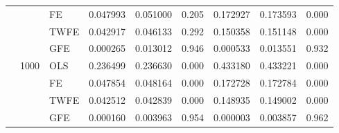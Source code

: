 \begin{tabular}{lll|ccc|ccc}
   &      & FE  &  0.047993 &  0.051000 &                 0.205 &  0.172927 &  0.173593 &                 0.000 \\
   &      & TWFE  &  0.042917 &  0.046133 &                 0.292 &  0.150358 &  0.151148 &                 0.000 \\
   &      & GFE  &  0.000265 &  0.013012 &                 0.946 &  0.000533 &  0.013551 &                 0.932 \\
   & 1000 & OLS  &  0.236499 &  0.236630 &                 0.000 &  0.433180 &  0.433221 &                 0.000 \\
   &      & FE  &  0.047854 &  0.048164 &                 0.000 &  0.172728 &  0.172784 &                 0.000 \\
   &      & TWFE  &  0.042512 &  0.042839 &                 0.000 &  0.148935 &  0.149002 &                 0.000 \\
   &      & GFE  &  0.000160 &  0.003963 &                 0.954 &  0.000003 &  0.003857 &                 0.962 \\
\bottomrule
\end{tabular}
